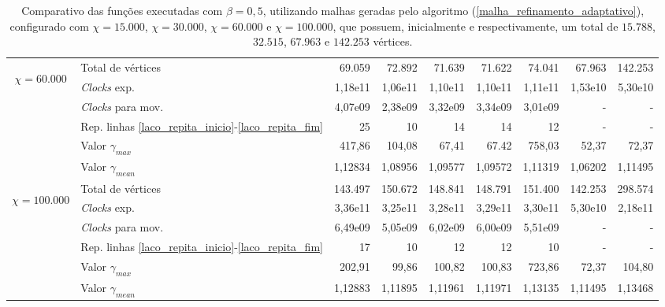 \begin{table}
\begin{center}
\begin{tabular}{|c|l|r|r|r|r|r|r|r|}
\hline %
\multirow{5}{*}{\begin{sideways}$\chi = 60.000$\end{sideways} } 
& Total de vértices                                                     & 69.059 & 72.892 & 71.639 & 71.622 & 74.041 & 67.963 & 142.253 \\
& {\it Clocks} exp.	                                             	& 1,18e11 & 1,06e11 & 1,10e11 & 1,10e11 & 1,11e11 & 1,53e10  & 5,30e10 \\
& {\it Clocks} para mov.                                      		& 4,07e09 & 2,38e09 & 3,32e09 & 3,34e09 & 3,01e09 & - & - \\
& Rep. linhas \ref{laco_repita_inicio}-\ref{laco_repita_fim} 		& 25 & 10 & 14 & 14 & 12 & - & - \\
& Valor $\gamma_{max}$							& 417,86 & 104,08 & 67,41 & 67.42 & 758,03 & 52,37 & 72,37 \\
& Valor $\gamma_{mean}$							& 1,12834 & 1,08956 & 1,09577 & 1,09572 & 1,11319 &  1,06202 & 1,11495 \\
\hline %
\multirow{5}{*}{\begin{sideways}$\chi = 100.000$\end{sideways} } 
& Total de vértices                                                     & 143.497 & 150.672 & 148.841 & 148.791 & 151.400 & 142.253 & 298.574 \\
& {\it Clocks} exp.	                                             	& 3,36e11 & 3,25e11 & 3,28e11 & 3,29e11 & 3,30e11 & 5,30e10 & 2,18e11 \\
& {\it Clocks} para mov.                                      		& 6,49e09 & 5,05e09 & 6,02e09 & 6,00e09 & 5,51e09 & - & - \\
& Rep. linhas \ref{laco_repita_inicio}-\ref{laco_repita_fim} 		& 17 & 10 & 12 & 12 & 10 & - & - \\
& Valor $\gamma_{max}$							& 202,91 & 99,86 & 100,82 & 100,83 & 723,86 & 72,37 & 104,80 \\
& Valor $\gamma_{mean}$							& 1,12883 & 1,11895 & 1,11961 & 1,11971 & 1,13135 & 1,11495 & 1,13468 \\
\hline %
\end{tabular}%
\end{center}
\caption{Comparativo das funções executadas com $\beta = 0,5$, utilizando malhas geradas pelo algoritmo (\ref{malha_refinamento_adaptativo}), configurado com $\chi = 15.000$, $\chi = 30.000$, $\chi = 60.000$ e $\chi = 100.000$, que possuem, inicialmente e respectivamente, um total de $15.788$, $32.515$, $67.963$ e $142.253$ vértices.} %
\label{tabelaComparativo_beta_5}
\end{table}


